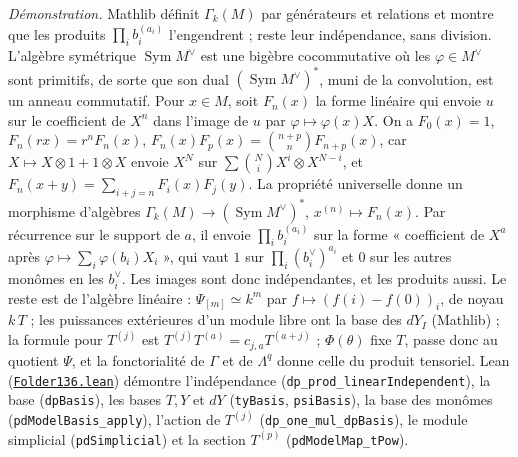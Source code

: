 {\small \emph{Démonstration.} Mathlib définit $\Gamma_k(M)$ par générateurs et relations et montre que les produits $\prod_i b_i^{(a_i)}$ l'engendrent ; reste leur indépendance, sans division. L'algèbre symétrique $\operatorname{Sym} M^\vee$ est une bigèbre cocommutative où les $\varphi \in M^\vee$ sont primitifs, de sorte que son dual $(\operatorname{Sym} M^\vee)^*$, muni de la convolution, est un anneau commutatif. Pour $x \in M$, soit $F_n(x)$ la forme linéaire qui envoie $u$ sur le coefficient de $X^n$ dans l'image de $u$ par $\varphi \mapsto \varphi(x) X$. On a $F_0(x) = 1$, $F_n(rx) = r^n F_n(x)$, $F_n(x) F_p(x) = \binom{n+p}{n} F_{n+p}(x)$, car $X \mapsto X \otimes 1 + 1 \otimes X$ envoie $X^N$ sur $\sum \binom{N}{i} X^i \otimes X^{N-i}$, et $F_n(x+y) = \sum_{i+j=n} F_i(x) F_j(y)$. La propriété universelle donne un morphisme d'algèbres $\Gamma_k(M) \to (\operatorname{Sym} M^\vee)^*$, $x^{(n)} \mapsto F_n(x)$. Par récurrence sur le support de $a$, il envoie $\prod_i b_i^{(a_i)}$ sur la forme « coefficient de $X^a$ après $\varphi \mapsto \sum_i \varphi(b_i) X_i$ », qui vaut $1$ sur $\prod_i (b_i^\vee)^{a_i}$ et $0$ sur les autres monômes en les $b_i^\vee$. Les images sont donc indépendantes, et les produits aussi. Le reste est de l'algèbre linéaire : $\Psi_{[m]} \simeq k^m$ par $f \mapsto (f(i) - f(0))_i$, de noyau $k\,T$ ; les puissances extérieures d'un module libre ont la base des $dY_I$ (Mathlib) ; la formule pour $T^{(j)}$ est $T^{(j)} T^{(a)} = c_{j,a} T^{(a+j)}$ ; $\Phi(\theta)$ fixe $T$, passe donc au quotient $\Psi$, et la fonctorialité de $\Gamma$ et de $\Lambda^q$ donne celle du produit tensoriel. Lean (\href{\leanblob/RingTheory/Folder136.lean}{\texttt{Folder136.\allowbreak{}lean}}) démontre l'indépendance (\texttt{dp\_prod\_linearIndependent}), la base (\texttt{dpBasis}), les bases $T, Y$ et $dY$ (\texttt{tyBasis}, \texttt{psiBasis}), la base des monômes (\texttt{pdModelBasis\_apply}), l'action de $T^{(j)}$ (\texttt{dp\_one\_mul\_dpBasis}), le module simplicial (\texttt{pdSimplicial}) et la section $T^{(p)}$ (\texttt{pdModelMap\_tPow}).\par}
